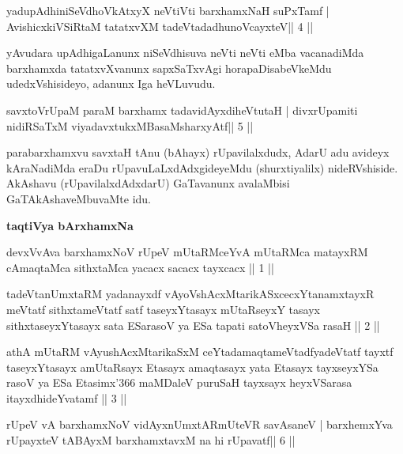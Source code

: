 \begin{shl}
yadupAdhiniSeVdhoVkAtxyX neVtiVti barxhamxNaH suPxTamf |
AvishicxkiVSiRtaM tatatxvXM tadeVtadadhunoVcayxteV\hfill || 4 ||
\end{shl}

\begin{artha}
yAvudara upAdhigaLanunx niSeVdhisuva neVti neVti eMba vacanadiMda barxhamxda tatatxvXvanunx sapxSaTxvAgi horapaDisabeVkeMdu udedxVshisideyo, adanunx Iga heVLuvudu.
\end{artha}



\begin{shl}
savxtoV\s rUpaM paraM barxhamx tadavidAyxdiheVtutaH |
divxrUpamiti nidiRSaTxM viyadavxtukxMBasaMsharxyAtf\hfill || 5 ||
\end{shl}

\begin{artha}
parabarxhamxvu savxtaH tAnu (bAhayx) rUpavilalxdudx, AdarU adu avideyx kAraNadiMda eraDu rUpavuLaLxdAdxgideyeMdu (shurxtiyalilx)  nideRVshiside. AkAshavu (rUpavilalxdAdxdarU) GaTavanunx avalaMbisi GaTAkAshaveMbuvaMte idu.
\end{artha}



{\centerline{\textbf{taqtiVya bArxhamxNa}}}
\medskip
{}

\begin{kandikeshl}
devxVvAva barxhamxNoV rUpeV mUtaRMceYvA mUtaRMca
matayxRM cAmaqtaMca sithxtaMca yacacx sacacx tayxcacx || 1 ||

tadeVtanUmxtaRM yadanayxdf vAyoVshAcxMtarikASxcecxYtanamxtayxR
meVtatf sithxtameVtatf satf taseyxYtasayx mUtaRseyxY tasayx
sithxtaseyxYtasayx sata ESarasoV ya ESa tapati satoVheyxVSa rasaH || 2 || 

athA mUtaRM vAyushAcxMtarikaSxM ceYtadamaqtameVtadfyadeVtatf tayxtf
taseyxYtasayx amUtaRsayx Etasayx amaqtasayx yata Etasayx tayxseyxYSa
rasoV ya ESa Etasimx\char'366 maMDaleV puruSaH tayxsayx heyxVSarasa
itayxdhideYvatamf || 3 ||
\end{kandikeshl}


\begin{shl}
rUpeV vA barxhamxNoV vidAyxnUmxtARmUteVR savAsaneV |
barxhemxYva rUpayxteV tABAyxM barxhamxtavxM na hi rUpavatf\hfill || 6 ||
\end{shl}

